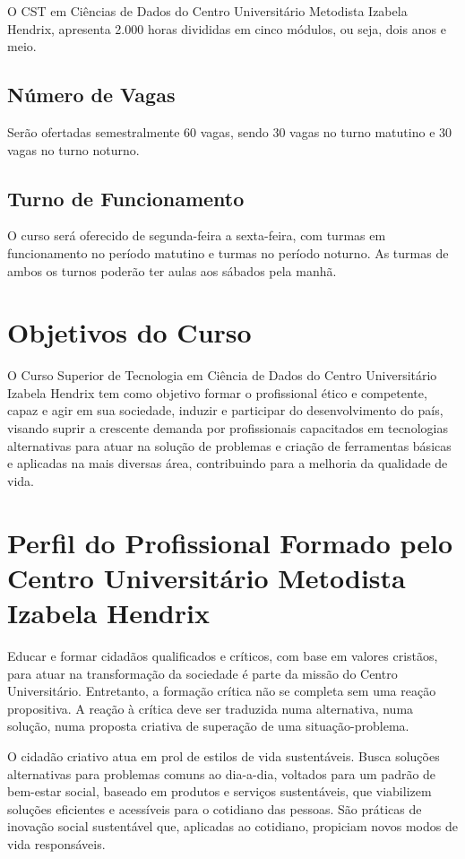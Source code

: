 \documentclass[a4paper, 12pt, openright, oneside, german, french, english, brazil]{abntex2}
\begin{document}
O CST em Ciências de Dados do Centro Universitário Metodista Izabela Hendrix, apresenta 2.000 horas divididas em cinco módulos, ou seja, dois anos e meio.

\section{Número de Vagas}
Serão ofertadas semestralmente 60 vagas, sendo 30 vagas no turno matutino e 30 vagas no turno noturno.

\section{Turno de Funcionamento}
O curso será oferecido de segunda-feira a sexta-feira, com turmas em funcionamento no período matutino e turmas no período noturno. As turmas de ambos os turnos poderão ter aulas aos sábados pela manhã.

\chapter{Objetivos do Curso}

O Curso Superior de Tecnologia em Ciência de Dados do Centro Universitário Izabela Hendrix tem como objetivo formar o profissional ético e competente, capaz e agir em sua sociedade, induzir e participar do desenvolvimento do país, visando suprir a crescente demanda por profissionais capacitados em tecnologias alternativas para atuar na solução de problemas e criação de ferramentas básicas e aplicadas na mais diversas área, contribuindo para a melhoria da qualidade de vida.

\chapter{Perfil do Profissional Formado pelo Centro Universitário Metodista Izabela Hendrix}

Educar e formar cidadãos qualificados e críticos, com base em valores cristãos, para atuar na transformação da sociedade é parte da missão do Centro Universitário. Entretanto, a formação crítica não se completa sem uma reação propositiva. A reação à crítica deve ser traduzida numa alternativa, numa solução, numa proposta criativa de superação de uma situação-problema.

O cidadão criativo atua em prol de estilos de vida sustentáveis. Busca soluções alternativas para problemas comuns ao dia-a-dia, voltados para um padrão de bem-estar social, baseado em produtos e serviços sustentáveis, que viabilizem soluções eficientes e acessíveis para o cotidiano das pessoas. São práticas de inovação social sustentável que, aplicadas ao cotidiano, propiciam novos modos de vida responsáveis.
\end{document}
